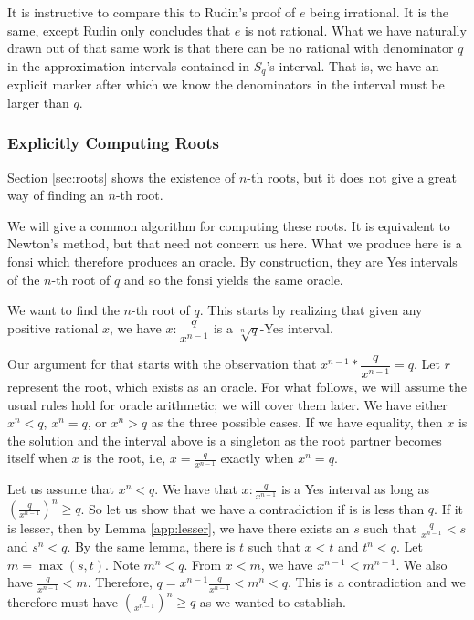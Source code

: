 \documentclass[12pt]{article}
\begin{document}
It is instructive to compare this to Rudin's proof of $e$ being irrational. It is the same, except Rudin only concludes that $e$ is not rational. What we have naturally drawn out of that same work is that there can be no rational with denominator $q$ in the approximation intervals contained in $S_q$'s interval. That is, we have an explicit marker after which we know the denominators in the interval must be larger than $q$. 

\subsubsection{Explicitly Computing Roots}

Section \ref{sec:roots} shows the existence of $n$-th roots, but it does not give a great way of finding an $n$-th root. 

We will give a common algorithm for computing these roots. It is equivalent to Newton's method, but that need not concern us here. What we produce here is a fonsi which therefore produces an oracle. By construction, they are Yes intervals of the $n$-th root of $q$ and so the fonsi yields the same oracle. 

We want to find the $n$-th root of $q$. This starts by realizing that given any positive rational $x$, we have $x:\dfrac{q}{x^{n-1}}$ is a $\sqrt[n]{q}$-Yes interval.

Our argument for that starts with the observation that $x^{n-1}*\dfrac{q}{x^{n-1}} = q$. Let $r$ represent the root, which exists as an oracle. For what follows, we will assume the usual rules hold for oracle arithmetic; we will cover them later. We have either $x^n < q$, $x^n = q$, or $x^n > q$ as the three possible cases. If we have equality, then $x$ is the solution and the interval above is a singleton as the root partner becomes itself when $x$ is the root, i.e, $x= \frac{q}{x^{n-1}}$ exactly when $x^n  =q$. 

Let us assume that $x^n < q$. We have that $x:\frac{q}{x^{n-1}}$ is a Yes interval as long as $(\frac{q}{x^{n-1}})^n \geq q$. So let us show that we have a contradiction if is is less than $q$. If it is lesser, then by Lemma \ref{app:lesser}, we have there exists an $s$ such that $\frac{q}{x^{n-1}} < s$ and $s^n < q$. By the same lemma, there is $t$ such that $x <t$ and $t^n < q$. Let $m = \max(s, t)$. Note $m^n < q$. From $x < m$, we have $x^{n-1} <m^{n-1}$. We also have $\frac{q}{x^{n-1}} < m$. Therefore, $q = x^{n-1} \frac{q}{x^{n-1}} < m^n < q$. This is a contradiction and we therefore must have $(\frac{q}{x^{n-1}})^n \geq q$ as we wanted to establish. 
\end{document}
